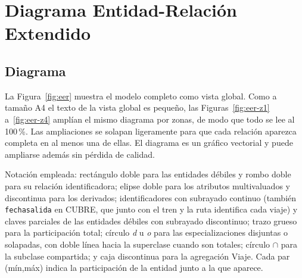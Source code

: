 \documentclass[11pt,a4paper]{article}
\DeclareRobustCommand{\_}{\textunderscore\allowbreak}
\newcommand{\tb}[1]{\texttt{#1}}
\begin{document}
\clearpage
\section{Diagrama Entidad-Relación Extendido}
\subsection{Diagrama}
La Figura~\ref{fig:eer} muestra el modelo completo como vista global. Como a tamaño A4 el texto de la vista global es pequeño, las Figuras~\ref{fig:eer-z1} a~\ref{fig:eer-z4} amplían el mismo diagrama por zonas, de modo que todo se lee al 100\,\%. Las ampliaciones se solapan ligeramente para que cada relación aparezca completa en al menos una de ellas. El diagrama es un gráfico vectorial y puede ampliarse además sin pérdida de calidad.

Notación empleada: rectángulo doble para las entidades débiles y rombo doble para su relación identificadora; elipse doble para los atributos multivaluados y discontinua para los derivados; identificadores con subrayado continuo (también \tb{fecha\_salida} en CUBRE, que junto con el tren y la ruta identifica cada viaje) y claves parciales de las entidades débiles con subrayado discontinuo; trazo grueso para la participación total; círculo \emph{d} u \emph{o} para las especializaciones disjuntas o solapadas, con doble línea hacia la superclase cuando son totales; círculo $\cap$ para la subclase compartida; y caja discontinua para la agregación Viaje. Cada par (mín,máx) indica la participación de la entidad junto a la que aparece.
\end{document}
